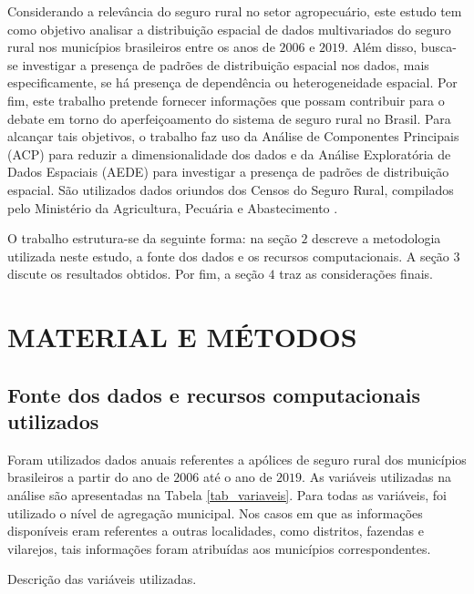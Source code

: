 
Considerando a relevância do seguro rural no setor agropecuário, este estudo tem como objetivo analisar a distribuição espacial de dados multivariados do seguro rural nos municípios brasileiros entre os anos de $2006$ e $2019$. Além disso, busca-se investigar a presença de padrões de distribuição espacial nos dados, mais especificamente, se há presença de dependência ou heterogeneidade espacial. Por fim, este trabalho pretende fornecer informações que possam contribuir para o debate em torno do aperfeiçoamento do sistema de seguro rural no Brasil. Para alcançar tais objetivos, o trabalho faz uso da Análise de Componentes Principais (ACP) para reduzir a dimensionalidade dos dados e da Análise Exploratória de Dados Espaciais (AEDE) para investigar a presença de padrões de distribuição espacial. São utilizados dados oriundos dos Censos do Seguro Rural, compilados pelo Ministério da Agricultura, Pecuária e Abastecimento \cite{brasil21_2}.

O trabalho estrutura-se da seguinte forma: na seção $2$ descreve a metodologia utilizada neste estudo, a fonte dos dados e os recursos computacionais. A seção $3$ discute os resultados obtidos. Por fim, a seção $4$ traz as considerações finais. 

\section{MATERIAL E MÉTODOS}\label{methods}

\subsection{Fonte dos dados e recursos computacionais utilizados}

Foram utilizados dados anuais referentes a apólices de seguro rural dos municípios brasileiros a partir do ano de $2006$ até o ano de $2019$. As variáveis utilizadas na análise são apresentadas na Tabela \ref{tab_variaveis}. Para todas as variáveis, foi utilizado o nível de agregação municipal. Nos casos em que as informações disponíveis eram referentes a outras localidades, como distritos, fazendas e vilarejos, tais informações foram atribuídas aos municípios correspondentes. 

\begin{small}
\begin{table}[H]
\caption{Descrição das variáveis utilizadas.}\label{tab_variaveis}
 
\end{table}
\end{small}
	
